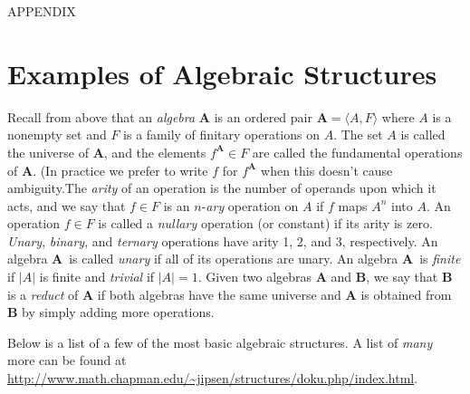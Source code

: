 \documentclass[12pt]{article}
\theoremstyle{plain}
\theoremstyle{definition}
\theoremstyle{remark}
\theoremstyle{remark}
\numberwithin{theorem}{section}
\numberwithin{equation}{section}
\newcommand{\<}{\ensuremath{\langle}}
\renewcommand{\>}{\ensuremath{\rangle}}
\newcommand{\bA}{\ensuremath{\mathbf{A}}}
\newcommand{\bB}{\ensuremath{\mathbf{B}}}
\begin{document}
\newpage

\appendix                       

\begin{center}
  APPENDIX
\end{center}


\section{Examples of Algebraic Structures}
\label{sec:exampl-algebr-struct}
Recall from above that an \emph{algebra}
$\bA$ is an ordered pair $\bA = \langle A, F\rangle$ 
where $A$ is a nonempty set and $F$ is a family of finitary operations on $A$.
The set $A$ is called the universe of \bA, and the elements $f^{\bA} \in F$ are 
called the fundamental operations of $\bA$. (In practice we prefer to 
write $f$ for $f^{\bA}$ when this doesn't cause
ambiguity.The \emph{arity} of an operation is the number of operands upon which it
acts, and we say that $f\in F$ is an $n$-\emph{ary} operation on
$A$ if $f$ maps $A^n$ into $A$.
An operation $f\in F$ is called a \emph{nullary} operation (or constant) 
if its arity is zero.  \emph{Unary}, \emph{binary}, and \emph{ternary} 
operations have arity 1, 2, and 3, respectively.  An algebra \bA\ is called 
\emph{unary} if all of its operations are unary.  An algebra \bA\ 
is \emph{finite} if $|A|$ is finite and \emph{trivial} if $|A| = 1$.
Given two algebras $\bA$ and $\bB$, we say that $\bB$ is a 
\emph{reduct} of $\bA$ if both algebras have the same universe and $\bA$
is obtained from $\bB$ by simply adding more operations.

Below is a list of a few of the most basic algebraic structures. 
A list of \emph{many} more can be found at
{\small \url{http://www.math.chapman.edu/~jipsen/structures/doku.php/index.html}}.
\end{document}
